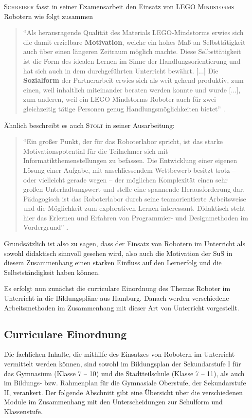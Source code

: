 \documentclass[paper=a4, DIV=calc, BCOR=12mm, twoside=on, onecolumn=on, open = right, titlepage =on, parskip =half-, headsepline = on, footsepline = off, chapterprefix = off, appendixprefix = on, fontsize = 12pt, numbers = noenddot, abstract = on]{scrbook}
\begin{document}
\textsc{Schreiber} fasst in seiner Examensarbeit den Einsatz von \textsc{LEGO Mindstorms} Robotern wie folgt zusammen
\begin{quote}
"`Als herausragende Qualität des Materials LEGO-Mindstorms erwies sich die damit erzielbare \textbf{Motivation}, welche ein hohes Maß an Selbsttätigkeit auch über einen längeren Zeitraum möglich machte. Diese Selbsttätigkeit ist die Form des idealen Lernen im Sinne der Handlungsorientierung und hat sich auch in dem durchgeführten Unterricht bewährt. [...] Die \textbf{Sozialform} der Partnerarbeit erwies sich als weit gehend produktiv, zum einen, weil inhaltlich miteinander beraten werden konnte und wurde [...], zum anderen, weil ein LEGO-Mindstorms-Roboter auch für zwei gleichzeitig tätige Personen genug Handlungsmöglichkeiten bietet"' \cite[S.47f.]{schreiber:04}.
\end{quote}

Ähnlich beschreibt es auch \textsc{Stolt} in seiner Ausarbeitung:
\begin{quote}
"`Ein großer Punkt, der für das Roboterlabor spricht, ist das starke Motivationspotential für die Teilnehmer sich mit Informatikthemenstellungen zu befassen. Die Entwicklung einer eigenen Lösung einer Aufgabe, mit anschliessendem Wettbewerb besitzt trotz – oder vielleicht gerade wegen – der möglichen Komplexität einen sehr großen Unterhaltungswert und stelle eine spannende Herausforderung dar. Pädagogisch ist das Roboterlabor durch seine teamorientierte Arbeitsweise und die Möglichkeit zum explorativen Lernen interessant. Didaktisch steht hier das Erlernen und Erfahren von Programmier- und Designmethoden im Vordergrund"' \cite[S.5f.]{stolt:01}.
\end{quote}

Grundsätzlich ist also zu sagen, dass der Einsatz von Robotern im Unterricht als sowohl didaktisch sinnvoll gesehen wird, also auch die Motivation der SuS in diesem Zusammenhang einen starken Einfluss auf den Lernerfolg und die Selbstständigkeit haben können.

Es erfolgt nun zunächst die curriculare Einordnung des Themas Roboter im Unterricht in die Bildungspläne aus Hamburg. Danach werden verschiedene Arbeitsmethoden im Zusammenhang mit dieser Art von Unterricht vorgestellt.
\clearpage

\subsection{Curriculare Einordnung}
Die fachlichen Inhalte, die mithilfe des Einsatzes von Robotern im Unterricht vermittelt werden können, sind sowohl im Bildungsplan der Sekundarstufe I für das Gymnasium (Klasse 7 -- 10) und die Stadtteilschule (Klasse 7 -- 11), als auch im Bildungs- bzw. Rahmenplan für die Gymnasiale Oberstufe, der Sekundarstufe II, verankert. Der folgende Abschnitt gibt eine Übersicht über die verschiedenen Module im Zusammenhang mit den Unterscheidungen zur Schulform und Klassenstufe.
\end{document}
